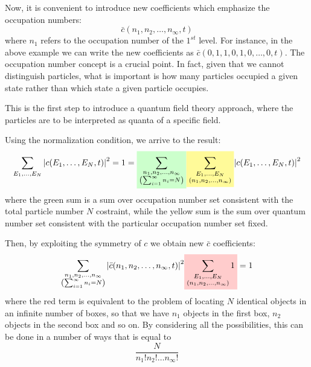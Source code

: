 \documentclass[../main/main.tex]{subfiles}
\begin{document}
Now, it is convenient to introduce new coefficients which emphasize the occupation numbers:  
\begin{equation*}
  \bar{c} (n_1,n_2, \dots, n_ \infty, t )
\end{equation*} 
where \( n_1 \) refers to the occupation number of the \( 1^{st} \) level. For instance, in the above example we can write the new coefficients as \( \bar{c} (0,1,1,0,1,0,\dots,0,t)  \).
The occupation number concept is a crucial point. In fact, given that we cannot distinguish particles, what is important is how many particles occupied a given state rather than which state a given particle occupies.
\begin{remark}
This is the first step to introduce a quantum field theory approach, where the particles are to be interpreted as quanta of a specific field.
\end{remark}

Using the normalization condition, we arrive to the result:
\begin{equation}
  \sum_{E_1,\dots,E_N}^{} \abs{c(E_1,\dots,E_N,t)}^2 = 1
  = \mathcolorbox{green!20}{\sum_{\substack{n_1,n_2,\dots,n_ \infty  \\ \qty(\sum_{i=1}^{\infty } n_i = N ) } }^{}} \mathcolorbox{yellow!40}{\sum_{\substack{E_1,\dots,E_N \\ (n_1,n_2,\dots,n_ \infty ) } }^{}}  \abs{c(E_1,\dots,E_N,t)}^2
\end{equation}
where the green sum is a sum over occupation number set consistent with the total particle number \( N \) costraint, while the yellow sum is the sum over quantum number set consistent with the particular occupation number set fixed.

Then, by exploiting the symmetry of \( c \) we obtain new \( \bar{c} \) coefficients:
\begin{equation}
\sum_{\substack{n_1,n_2,\dots,n_ \infty  \\ \qty(\sum_{i=1}^{\infty } n_i = N ) } }^{} \abs{\bar{c}(n_1,n_2,\dots,n_ \infty ,t) }^2 \mathcolorbox{red!20}{ \sum_{\substack{E_1,\dots,E_N \\ (n_1,n_2,\dots,n_ \infty ) } }^{} 1 }  = 1
\end{equation}
where the red term is equivalent to the problem of locating \( N \) identical objects in an infinite number of boxes, so that we have \( n_1 \) objects in the first box, \( n_2 \) objects in the second box and so on.
By considering all the possibilities, this can be done in a number of ways that is equal to
\begin{equation*}
  \frac{N}{n_1!n_2! \dots n_ \infty !}
\end{equation*}
\end{document}
